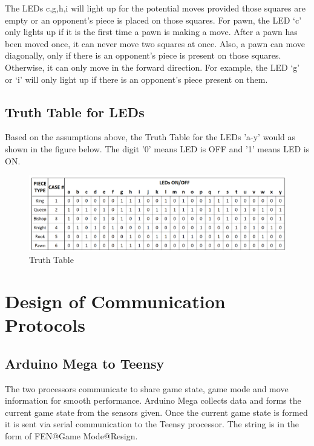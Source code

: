 \documentclass[12pt, titlepage]{article}
\begin{document}
\begin{itemize}
  The LEDs c,g,h,i will light up for the potential moves provided those squares are empty or an opponent’s piece is placed on those squares. For pawn, the LED ‘c’ only 
  lights up if it is the first time a pawn is making a move. After a pawn has been moved once, it can never move two squares at once. Also, a pawn can move diagonally, 
  only if there is an opponent’s piece is present on those squares. Otherwise, it can only move in the forward direction. For example, the LED ‘g’ or ‘i’ will only light 
  up if there is an opponent’s piece present on them. 

  \end{itemize}
  


\subsection*{Truth Table for LEDs}

Based on the assumptions above, the Truth Table for the LEDs 'a-y' would as shown in the figure below. 
The digit '0' means LED is OFF and '1' means LED is ON.

\begin{figure}[h]
  \centering
  \includegraphics[width=1\textwidth]{truth_table}
  \caption{Truth Table}
\end{figure}

\section{Design of Communication Protocols}

\subsection{Arduino Mega to Teensy}
The two processors communicate to share game state, game mode and move information for smooth 
performance. Arduino Mega collects data and forms the current game state from the sensors given. 
Once the current game state is formed it is sent via serial communication to the Teensy 
processor. The string is in the form of FEN@Game Mode@Resign. 
\end{document}
